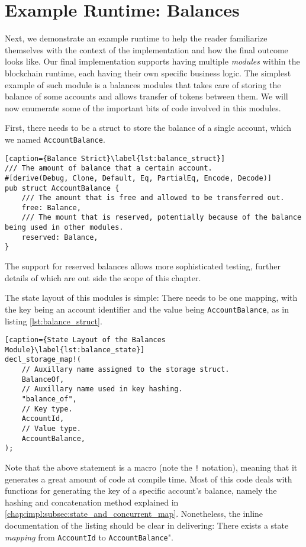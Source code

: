 \section{Example Runtime: Balances}

Next, we demonstrate an example runtime to help the reader familiarize themselves with the context
of the implementation and how the final outcome looks like. Our final implementation supports having
multiple \textit{modules} within the blockchain runtime, each having their own specific business
logic. The simplest example of such module is a balances modules that takes care of storing the
balance of some accounts and allows transfer of tokens between them. We will now enumerate some of
the important bits of code involved in this modules.

First, there needs to be a struct to store the balance of a single account, which we named
\texttt{AccountBalance}.

\begin{lstlisting}[caption={Balance Strict}\label{lst:balance_struct}]
/// The amount of balance that a certain account.
#[derive(Debug, Clone, Default, Eq, PartialEq, Encode, Decode)]
pub struct AccountBalance {
	/// The amount that is free and allowed to be transferred out.
	free: Balance,
	/// The mount that is reserved, potentially because of the balance being used in other modules.
	reserved: Balance,
}
\end{lstlisting}

The support for reserved balances allows more sophisticated testing, further details of which are
out side the scope of this chapter.

The state layout of this modules is simple: There needs to be one mapping, with the key being an
account identifier and the value being \texttt{AccountBalance}, as in listing
\ref{lst:balance_struct}.

\begin{lstlisting}[caption={State Layout of the Balances Module}\label{lst:balance_state}]
decl_storage_map!(
	// Auxillary name assigned to the storage struct.
	BalanceOf,
	// Auxillary name used in key hashing.
	"balance_of",
	// Key type.
	AccountId,
	// Value type.
	AccountBalance,
);
\end{lstlisting}

Note that the above statement is a macro (note the \texttt{!} notation), meaning that it generates a
great amount of code at compile time. Most of this code deals with functions for generating the key
of a specific account's balance, namely the hashing and concatenation method explained in
\ref{chap:impl:subsec:state_and_concurrent_map}. Nonetheless, the inline documentation of the
listing should be clear in delivering: There exists a state \textit{mapping} from \texttt{AccountId}
to \texttt{AccountBalance}".


